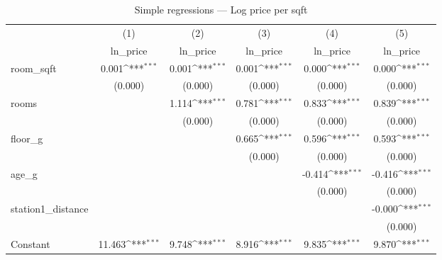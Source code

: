 \begin{table}[htbp]\centering
\def\sym#1{\ifmmode^{#1}\else\(^{#1}\)\fi}
\caption{Simple regressions — Log price per sqft}
\begin{tabular}{l*{5}{c}}
\toprule
                    &\multicolumn{1}{c}{(1)}&\multicolumn{1}{c}{(2)}&\multicolumn{1}{c}{(3)}&\multicolumn{1}{c}{(4)}&\multicolumn{1}{c}{(5)}\\
                    &\multicolumn{1}{c}{ln\_price}&\multicolumn{1}{c}{ln\_price}&\multicolumn{1}{c}{ln\_price}&\multicolumn{1}{c}{ln\_price}&\multicolumn{1}{c}{ln\_price}\\
\midrule
room\_sqft           &       0.001\sym{***}&       0.001\sym{***}&       0.001\sym{***}&       0.000\sym{***}&       0.000\sym{***}\\
                    &     (0.000)         &     (0.000)         &     (0.000)         &     (0.000)         &     (0.000)         \\
\addlinespace
rooms               &                     &       1.114\sym{***}&       0.781\sym{***}&       0.833\sym{***}&       0.839\sym{***}\\
                    &                     &     (0.000)         &     (0.000)         &     (0.000)         &     (0.000)         \\
\addlinespace
floor\_g             &                     &                     &       0.665\sym{***}&       0.596\sym{***}&       0.593\sym{***}\\
                    &                     &                     &     (0.000)         &     (0.000)         &     (0.000)         \\
\addlinespace
age\_g               &                     &                     &                     &      -0.414\sym{***}&      -0.416\sym{***}\\
                    &                     &                     &                     &     (0.000)         &     (0.000)         \\
\addlinespace
station1\_distance   &                     &                     &                     &                     &      -0.000\sym{***}\\
                    &                     &                     &                     &                     &     (0.000)         \\
\addlinespace
Constant            &      11.463\sym{***}&       9.748\sym{***}&       8.916\sym{***}&       9.835\sym{***}&       9.870\sym{***}\\

\end{tabular}
\end{table}
